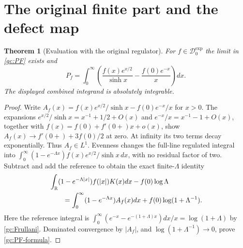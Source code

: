 \documentclass[11pt]{article}
\newtheorem{theorem}{Theorem}
\newcommand{\R}{\mathbb R}
\begin{document}
\section{The original finite part and the defect map}

\begin{theorem}[Evaluation with the original regulator]
For $f\in\mathcal D_0^{\exp}$ the limit in \eqref{gc:PF} exists and
\begin{equation}
 \boxed{\displaystyle
 P_f=\int_0^\infty\left(
       \frac{f(x)e^{x/2}}{\sinh x}-\frac{f(0)e^{-x}}{x}\right)dx.}
 \label{gc:PF-formula}
\end{equation}
The displayed combined integrand is absolutely integrable.
\end{theorem}
\begin{proof}
Write $A_f(x)=f(x)e^{x/2}/\sinh x-f(0)e^{-x}/x$ for $x>0$.
The expansions
$e^{x/2}/\sinh x=x^{-1}+1/2+O(x)$ and
$e^{-x}/x=x^{-1}-1+O(x)$, together with
$f(x)=f(0)+f'(0+)x+o(x)$, show
$A_f(x)\to f'(0+)+3f(0)/2$ at zero.
At infinity its two terms decay exponentially.  Thus $A_f\in L^1$.
Evenness changes the full-line regulated integral into
$\int_0^\infty(1-e^{-\Lambda x})f(x)e^{x/2}/\sinh x\,dx$,
with no residual factor of two.  Subtract and add the reference to obtain
the exact finite-$\Lambda$ identity
\begin{align}
 &\int_\R(1-e^{-\Lambda|x|})f(|x|)K(x)dx-f(0)\log\Lambda\notag\\
 &\qquad=\int_0^\infty(1-e^{-\Lambda x})A_f(x)dx
              +f(0)\log(1+\Lambda^{-1}).
 \label{gc:finite-regulator}
\end{align}
Here the reference integral is
$\int_0^\infty(e^{-x}-e^{-(1+\Lambda)x})dx/x=\log(1+\Lambda)$
by \eqref{gc:Frullani}.  Dominated convergence by $|A_f|$, and
$\log(1+\Lambda^{-1})\to0$, prove \eqref{gc:PF-formula}.
\end{proof}
\end{document}
